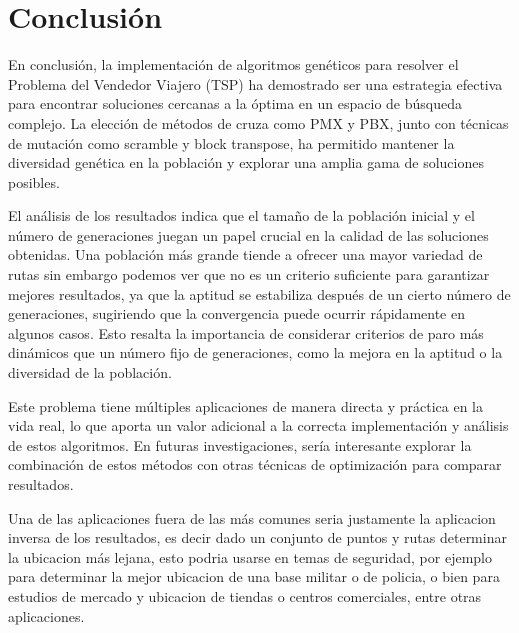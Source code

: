 \section{Conclusión}

En conclusión, la implementación de algoritmos genéticos para resolver el Problema del Vendedor Viajero (TSP) ha demostrado ser una estrategia 
efectiva para encontrar soluciones cercanas a la óptima en un espacio de búsqueda complejo. La elección de métodos de cruza como PMX y PBX, 
junto con técnicas de mutación como scramble y block transpose, ha permitido mantener la diversidad genética en la población y explorar una 
amplia gama de soluciones posibles.

El análisis de los resultados indica que el tamaño de la población inicial y el número de generaciones juegan un papel crucial en la calidad
de las soluciones obtenidas. Una población más grande tiende a ofrecer una mayor variedad de rutas sin embargo podemos ver que no es un criterio
suficiente para garantizar mejores resultados, ya que la aptitud se estabiliza después de un cierto número de generaciones, sugiriendo que
la convergencia puede ocurrir rápidamente en algunos casos. Esto resalta la importancia de considerar criterios de paro más dinámicos que un número fijo de generaciones,
como la mejora en la aptitud o la diversidad de la población.

Este problema tiene múltiples aplicaciones de manera directa y práctica en la vida real, lo que aporta un valor adicional a la correcta
implementación y análisis de estos algoritmos. En futuras investigaciones, sería interesante explorar la combinación de estos métodos con otras
técnicas de optimización para comparar resultados.

Una de las aplicaciones fuera de las más comunes seria justamente la aplicacion inversa de los resultados, es decir dado un conjunto de
puntos y rutas determinar la ubicacion más lejana, esto podria usarse en temas de seguridad, por ejemplo para determinar la mejor ubicacion
de una base militar o de policia, o bien para estudios de mercado y ubicacion de tiendas o centros comerciales, entre otras aplicaciones.